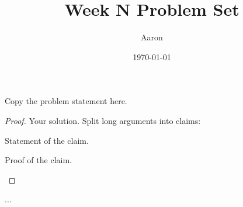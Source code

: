 \documentclass[11pt]{scrartcl}
\title{Week N Problem Set}   %
\author{Aaron}
\date{\today}
\begin{document}
\maketitle

\begin{problem}[P\&B 1]
  Copy the problem statement here.
\end{problem}


\begin{proof}
  Your solution. Split long arguments into claims:

  \begin{claim}
    Statement of the claim.
  \end{claim}
  \begin{subproof}
    Proof of the claim.
  \end{subproof}
\end{proof}


\newpage

\begin{problem}[P\&B 2]
  ...
\end{problem}
\end{document}
